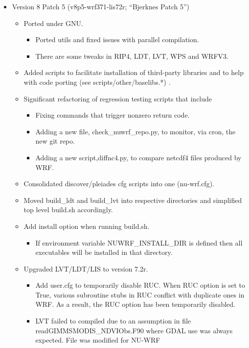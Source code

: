 \begin{itemize}

\item Version 8 Patch 5 (v8p5-wrf371-lis72r; ``Bjerknes Patch 5'')
\begin{itemize}
\item  Ported under GNU.
  \begin{itemize}
  \item Ported utils and fixed issues with parallel compilation.
  \item There are some tweaks in RIP4, LDT, LVT, WPS and WRFV3.
  \end{itemize}
\item  Added scripts to facilitate installation of third-party libraries
  and to help with code porting (see scripts/other/baselibs.*) .
\item  Significant refactoring of regression testing scripts that include
  \begin{itemize}
 \item Fixing commands that trigger nonzero return code.
 \item Adding a new file, check\_nuwrf\_repo.py, to monitor, via cron, the
   new git repo.
 \item Adding a new script,diffnc4.py, to compare netcdf4 files produced by WRF.
  \end{itemize}
\item  Consolidated discover/pleiades cfg scripts into one (nu-wrf.cfg).
\item  Moved build\_ldt and build\_lvt into respective directories and simplified
  top level build.sh accordingly.
\item  Add install option when running build.sh.
  \begin{itemize}
 \item If environment variable NUWRF\_INSTALL\_DIR is defined then all
   executables will be installed in that directory.
  \end{itemize}
\item  Upgraded LVT/LDT/LIS to version 7.2r.
  \begin{itemize}
 \item Add user.cfg to temporarily disable RUC.
   When RUC option is set to True, various subroutine stubs in RUC
   conflict with duplicate ones in WRF. As a result, the RUC option has been
   temporarily disabled.
 \item LVT failed to compiled due to an assumption in file
   readGIMMSMODIS\_NDVIObs.F90
   where GDAL use was always expected. File was modified for NU-WRF

\end{itemize}
\end{itemize}
\end{itemize}
